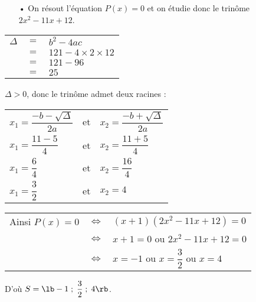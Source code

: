 \begin{itemize}
\item[•] On résout l'équation $P(x) = 0$ et on étudie donc le trinôme $2x^2 - 11x + 12$. \\
\end{itemize}


\begin{tabular}{lll}
$\Delta$ & $=$ & $b^2-4ac$ \\
& $=$ & $121 - 4 \times 2 \times 12$ \\
& $=$ & $121 - 96$ \\
& $=$ & $25$ \\
\end{tabular}

\vspace*{.3cm}

$\Delta > 0$, donc le trinôme admet deux racines : \\

\begin{tabular}{lll}
$x_1 = \dfrac{-b - \sqrt{\Delta}}{2a}$ & et & $x_2 = \dfrac{-b + \sqrt{\Delta}}{2a}$ \vspace*{.3cm} \\
$x_1 = \dfrac{11 - 5}{4}$ & et & $x_2 = \dfrac{11 + 5}{4}$ \vspace*{.3cm} \\
$x_1 = \dfrac{6}{4}$ & et & $x_2 = \dfrac{16}{4}$ \vspace*{.3cm} \\
$x_1 = \dfrac{3}{2}$ & et & $x_2 = 4$ \\
\end{tabular}

\vspace*{.3cm}

\begin{tabular}{lll}
Ainsi $P(x) = 0$ & $\Longleftrightarrow$ & $\left(x+1\right)\left(2x^2 - 11x + 12\right) = 0$ \\
& $\Longleftrightarrow$ & $x+1 = 0$ ou $2x^2 - 11x + 12 = 0$ \\
& $\Longleftrightarrow$ & $x = -1$ ou $x = \dfrac{3}{2}$ ou $x = 4$ \\
\end{tabular}

\vspace*{.3cm}

D'où $S = \lb -1 \; ; \; \dfrac{3}{2} \; ; \; 4\rb$.

\newpage


